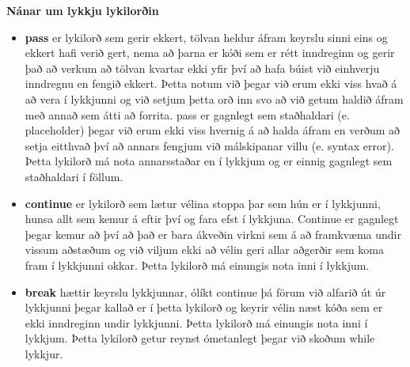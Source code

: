 \begin{itarefni}
\textbf{Nánar um lykkju lykilorðin}\\	
\begin{itemize}[leftmargin=*]
\item \textbf{pass} er lykilorð sem gerir ekkert, tölvan heldur áfram keyrslu sinni eins og ekkert hafi verið gert, nema að þarna er kóði sem er rétt inndreginn og gerir það að verkum að tölvan kvartar ekki yfir því að hafa búist við einhverju inndregnu en fengið ekkert.
Þetta notum við þegar við erum ekki viss hvað á að vera í lykkjunni og við setjum þetta orð inn svo að við getum haldið áfram með annað sem átti að forrita.
pass er gagnlegt sem staðhaldari (e. placeholder) þegar við erum ekki viss hvernig á að halda áfram en verðum að setja eitthvað því að annars fengjum við málskipanar villu (e. syntax error).
Þetta lykilorð má nota annarsstaðar en í lykkjum og er einnig gagnlegt sem staðhaldari í föllum.
\item \textbf{continue} er lykilorð sem lætur vélina stoppa þar sem hún er í lykkjunni, hunsa allt sem kemur á eftir því og fara efst í lykkjuna.
Continue er gagnlegt þegar kemur að því að það er bara ákveðin virkni sem á að framkvæma undir vissum aðstæðum og við viljum ekki að vélin geri allar aðgerðir sem koma fram í lykkjunni okkar.
Þetta lykilorð má einungis nota inni í lykkjum.
\item \textbf{break} hættir keyrslu lykkjunnar, ólíkt continue þá förum við alfarið út úr lykkjunni þegar kallað er í þetta lykilorð og keyrir vélin næst kóða sem er ekki inndreginn undir lykkjunni.
Þetta lykilorð má einungis nota inni í lykkjum.		
Þetta lykilorð getur reynst ómetanlegt þegar við skoðum while lykkjur.
\end{itemize}

\end{itarefni}


